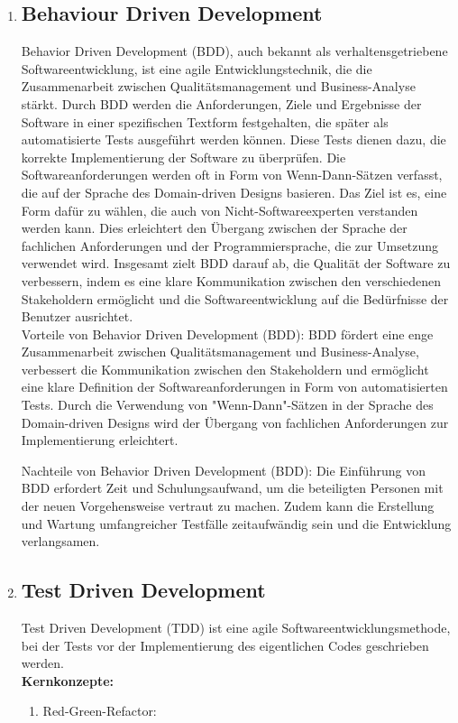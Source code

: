 \documentclass{article}
\begin{document}
\begin{enumerate}[label=\alph*)]
   \item \subsection*{Behaviour Driven Development}
   Behavior Driven Development (BDD), auch bekannt als verhaltensgetriebene Softwareentwicklung, ist eine agile Entwicklungstechnik, die die Zusammenarbeit zwischen Qualitätsmanagement und Business-Analyse stärkt. Durch BDD werden die Anforderungen, Ziele und Ergebnisse der Software in einer spezifischen Textform festgehalten, die später als automatisierte Tests ausgeführt werden können. Diese Tests dienen dazu, die korrekte Implementierung der Software zu überprüfen. Die Softwareanforderungen werden oft in Form von Wenn-Dann-Sätzen verfasst, die auf der Sprache des Domain-driven Designs basieren. Das Ziel ist es, eine Form dafür zu wählen, die auch von Nicht-Softwareexperten verstanden werden kann.  Dies erleichtert den Übergang zwischen der Sprache der fachlichen Anforderungen und der Programmiersprache, die zur Umsetzung verwendet wird. Insgesamt zielt BDD darauf ab, die Qualität der Software zu verbessern, indem es eine klare Kommunikation zwischen den verschiedenen Stakeholdern ermöglicht und die Softwareentwicklung auf die Bedürfnisse der Benutzer ausrichtet.\\
   
   Vorteile von Behavior Driven Development (BDD):
BDD fördert eine enge Zusammenarbeit zwischen Qualitätsmanagement und Business-Analyse, verbessert die Kommunikation zwischen den Stakeholdern und ermöglicht eine klare Definition der Softwareanforderungen in Form von automatisierten Tests. Durch die Verwendung von "Wenn-Dann"-Sätzen in der Sprache des Domain-driven Designs wird der Übergang von fachlichen Anforderungen zur Implementierung erleichtert.

Nachteile von Behavior Driven Development (BDD):
Die Einführung von BDD erfordert Zeit und Schulungsaufwand, um die beteiligten Personen mit der neuen Vorgehensweise vertraut zu machen. Zudem kann die Erstellung und Wartung umfangreicher Testfälle zeitaufwändig sein und die Entwicklung verlangsamen.

   \item \subsection*{Test Driven Development}
   Test Driven Development (TDD) ist eine agile Softwareentwicklungsmethode, bei der Tests vor der Implementierung des eigentlichen Codes geschrieben werden.\\
   \textbf{Kernkonzepte:}\\
   \begin{enumerate}[label=\arabic*)] 
\item Red-Green-Refactor:


\end{enumerate}
\end{enumerate}
\end{document}
